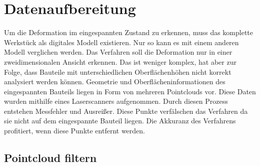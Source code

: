 

\chapter{Datenaufbereitung}

Um die Deformation im eingespannten Zustand zu erkennen, muss das komplette Werkstück
als digitales Modell existieren. Nur so kann es mit einem anderen Modell 
verglichen werden.
Das Verfahren soll die Deformation nur in einer zweidimensionalen Ansicht erkennen. 
Das ist weniger komplex, hat aber zur Folge, dass Bauteile mit unterschiedlichen 
Oberflächenhöhen nicht korrekt analysiert werden können. 
Geometrie und Oberflächeninformationen des eingespannten Bauteils liegen 
in Form von mehreren Pointclouds vor.
Diese Daten wurden mithilfe eines Laserscanners aufgenommen. Durch diesen Prozess 
entstehen Messfehler und Ausreißer. Diese Punkte verfälschen das Verfahren da sie 
nicht auf dem eingespannte Bauteil liegen. Die Akkuranz des Verfahrens profitiert, 
wenn diese Punkte entfernt werden.

\section{Pointcloud filtern}

